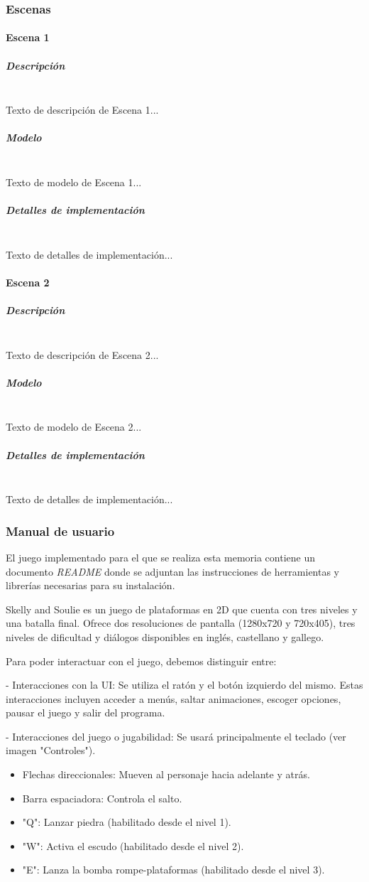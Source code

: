 \documentclass[12pt,a4paper,twoside,spanish]{article}      %
\begin{document}
\subsubsection{Escenas}
\paragraph{Escena 1}
\subparagraph{Descripción}\\
Texto de descripción de Escena 1...

\subparagraph{Modelo}\\
Texto de modelo de Escena 1...

\subparagraph{Detalles de implementación}\\
Texto de detalles de implementación...


\paragraph{Escena 2}
\subparagraph{Descripción}\\
Texto de descripción de Escena 2...

\subparagraph{Modelo}\\
Texto de modelo de Escena 2...

\subparagraph{Detalles de implementación}\\
Texto de detalles de implementación...


\subsubsection{Manual de usuario}
El juego implementado para el que se realiza esta memoria contiene un documento \emph{README} donde se adjuntan las instrucciones de herramientas y librerías necesarias para su instalación.

Skelly and Soulie es un juego de plataformas en 2D que cuenta con tres niveles y una batalla final. Ofrece dos resoluciones de pantalla (1280x720 y 720x405), tres niveles de dificultad y diálogos disponibles en inglés, castellano y gallego.

Para poder interactuar con el juego, debemos distinguir entre:

- Interacciones con la UI: Se utiliza el ratón y el botón izquierdo del mismo. Estas interacciones incluyen acceder a menús, saltar animaciones, escoger opciones, pausar el juego y salir del programa.

- Interacciones del juego o jugabilidad: Se usará principalmente el teclado (ver imagen "Controles").
\begin{itemize}
    \item Flechas direccionales: Mueven al personaje hacia adelante y atrás.
    \item Barra espaciadora: Controla el salto.
    \item "Q": Lanzar piedra (habilitado desde el nivel 1).
    \item "W": Activa el escudo (habilitado desde el nivel 2).
    \item "E": Lanza la bomba rompe-plataformas (habilitado desde el nivel 3).
\end{itemize}
\end{document}

